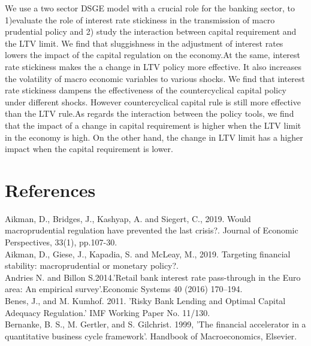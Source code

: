 \documentclass[12pt]{article}
\numberwithin{equation}{section}
\begin{document}
We use a two sector DSGE model with a crucial role for the banking sector,  to 1)evaluate the role of interest rate stickiness in the transmission of macro prudential policy and 2) study the interaction between capital requirement and the LTV limit. We find that sluggishness in the adjustment of interest rates lowers the impact of the capital regulation on the economy.At the same, interest rate stickiness makes the a change in LTV policy more effective. It also increases the volatility of macro economic variables to various shocks. We find that interest rate stickiness dampens the effectiveness of the countercyclical capital policy under different shocks. However countercyclical capital rule is still more effective than the LTV rule.As regards the interaction between the policy tools, we find that the impact of a change in capital requirement is higher when the LTV limit in the economy is high. On the other hand, the change in LTV limit has a higher impact when the capital requirement is lower.















\section{References}

\hspace*{0.6cm}

Aikman, D., Bridges, J., Kashyap, A. and Siegert, C., 2019. Would macroprudential regulation have prevented the last crisis?. Journal of Economic Perspectives, 33(1), pp.107-30. \\

Aikman, D., Giese, J., Kapadia, S. and McLeay, M., 2019. Targeting financial stability: macroprudential or monetary policy?. \\

Andries N. and Billon S.2014.'Retail bank interest rate pass-through in the Euro area: An empirical survey'.Economic Systems 40 (2016) 170–194.\\

Benes, J., and M. Kumhof. 2011. 'Risky Bank Lending and Optimal
Capital Adequacy Regulation.' IMF Working Paper No. 11/130.\\


Bernanke, B. S., M. Gertler, and S. Gilchrist. 1999, 'The financial accelerator in a quantitative business cycle framework'. Handbook of Macroeconomics, Elsevier.\\
\end{document}
